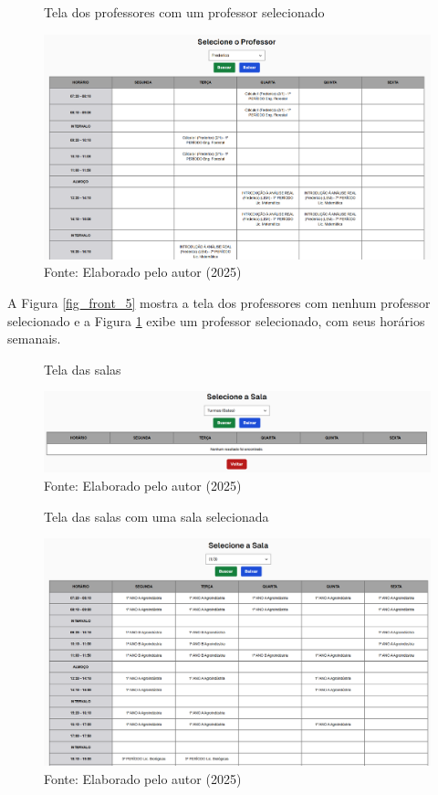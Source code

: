\begin{figure}[H]
    \centering
    \caption{Tela dos professores com um professor selecionado}
    \includegraphics[width=1\textwidth]{Figuras/front-6.png}
    \caption*{Fonte: Elaborado pelo autor (2025)}
    \label{fig_front_6}
\end{figure}

A Figura \ref{fig_front_5} mostra a tela dos professores com nenhum professor selecionado e a Figura \ref{fig_front_6} exibe um professor selecionado, com seus horários semanais.

\begin{figure}[H]
    \centering
    \caption{Tela das salas}
    \includegraphics[width=1\textwidth]{Figuras/front-7.png}
    \caption*{Fonte: Elaborado pelo autor (2025)}
    \label{fig_front_7}
\end{figure}

\begin{figure}[htb]
    \centering
    \caption{Tela das salas com uma sala selecionada}
    \includegraphics[width=1\textwidth]{Figuras/front-8.png}
    \caption*{Fonte: Elaborado pelo autor (2025)}
    \label{fig_front_8}
\end{figure}

